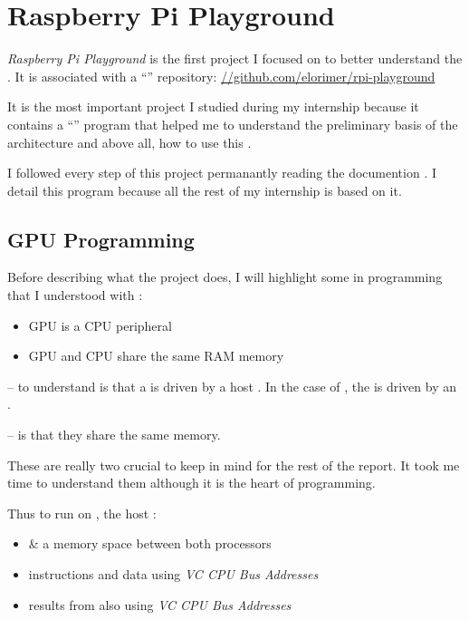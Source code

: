 \section{Raspberry Pi Playground}

\emph{Raspberry Pi Playground} \parencite{refRpiPlayground} is the first project I focused on to better understand the \vc. It is associated with a \enquote{} repository: \url{//github.com/elorimer/rpi-playground}

It is the most important project I studied during my internship because it contains a \enquote{} program that helped me to understand the preliminary basis of the \vc{} architecture and above all, how to use this .

I followed every step of this project permanantly reading the \vc{} documention \parencite{refVC}. I detail this program because all the rest of my internship is based on it.

\subsection{GPU Programming}
\label{concepts}
Before describing what the  project does, I will highlight some  in \vc{} programming that I understood with \parencite{refRpiPlayground}:

\begin{itemize}
	\item GPU is a CPU peripheral
	\item GPU and CPU share the same RAM memory
\end{itemize}

--  to understand is that a  is driven by a host . In the case of \bcm, the \vc{} is driven by an \cpu{}.

--  is that they share the same  memory.

These are really two crucial  to keep in mind for the rest of the report. It took me time to understand them although it is the heart of \vc{} programming.

\vspace{5mm}
Thus to run  on , the host :
\begin{itemize}
	\item {} \&  a \ram{} memory space between both processors
	\item {} instructions and data using \emph{VC CPU Bus Addresses}
	\item {} results from  also using \emph{VC CPU Bus Addresses}
\end{itemize}

